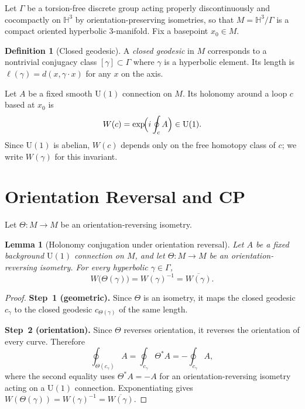 ﻿\documentclass[12pt]{article}
\newtheorem{lemma}[theorem]{Lemma}
\theoremstyle{definition}
\newtheorem{definition}[theorem]{Definition}
\theoremstyle{remark}
\newcommand{\Hthree}{\mathbb{H}^3}
\newcommand{\GammaG}{\Gamma}
\newcommand{\Uone}{\mathrm{U}(1)}
\begin{document}
Let $\GammaG$ be a torsion-free discrete group acting properly
discontinuously and cocompactly on $\Hthree$ by orientation-preserving
isometries, so that $M=\Hthree/\GammaG$ is a compact oriented hyperbolic
3-manifold. Fix a basepoint $x_0\in M$.

\begin{definition}[Closed geodesic]\label{def:geodesic}
A \emph{closed geodesic} in $M$ corresponds to a nontrivial conjugacy class
$[\gamma]\subset\GammaG$ where $\gamma$ is a hyperbolic element. Its length
is $\ell(\gamma)=d(x,\gamma\cdot x)$ for any $x$ on the axis.
\end{definition}

Let $A$ be a fixed smooth $\Uone$ connection on $M$. Its holonomy around a
loop $c$ based at $x_0$ is
\begin{equation}\label{eq:holonomy}
W(c)=\exp\!\Bigl(i\oint_c A\Bigr)\in\Uone.
\end{equation}
Since $\Uone$ is abelian, $W(c)$ depends only on the free homotopy class
of $c$; we write $W(\gamma)$ for this invariant.

\section{Orientation Reversal and CP}

Let $\Theta\colon M\to M$ be an orientation-reversing isometry.

\begin{lemma}[Holonomy conjugation under orientation reversal]
\label{lem:hol-conj}
Let $A$ be a fixed background $\Uone$ connection on $M$, and let
$\Theta\colon M\to M$ be an orientation-reversing isometry. For every
hyperbolic $\gamma\in\GammaG$,
\begin{equation}
W\!\bigl(\Theta(\gamma)\bigr)=W(\gamma)^{-1}=\overline{W(\gamma)}.
\end{equation}
\end{lemma}

\begin{proof}
\textbf{Step~1 (geometric).} Since $\Theta$ is an isometry, it maps the
closed geodesic $c_\gamma$ to the closed geodesic $c_{\Theta(\gamma)}$ of
the same length.

\textbf{Step~2 (orientation).} Since $\Theta$ reverses orientation, it
reverses the orientation of every curve. Therefore
\begin{equation}
\oint_{\Theta(c_\gamma)}A=\oint_{c_\gamma}\Theta^*A=-\oint_{c_\gamma}A,
\end{equation}
where the second equality uses $\Theta^*A=-A$ for an orientation-reversing
isometry acting on a $\Uone$ connection.
Exponentiating gives
$W(\Theta(\gamma))=W(\gamma)^{-1}=\overline{W(\gamma)}$.
\end{proof}
\end{document}
